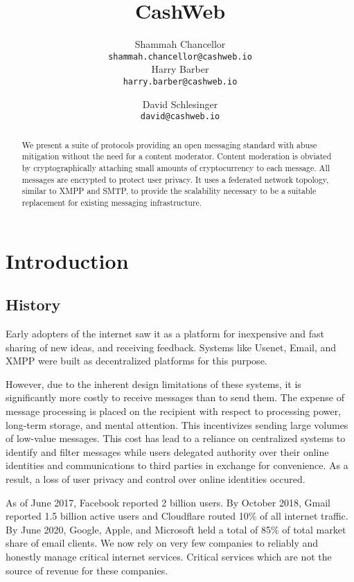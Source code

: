 \documentclass{article}
\title{CashWeb}
\author{
  Shammah Chancellor \\
  \texttt{shammah.chancellor@cashweb.io} \\
  \AND
  Harry Barber \\
  \texttt{harry.barber@cashweb.io} \\
  \and
  David Schlesinger \\
  \texttt{david@cashweb.io} \\
}
\begin{document}
\maketitle

\begin{abstract}
We present a suite of protocols providing an open messaging standard with abuse mitigation without the need for a content moderator. Content moderation is obviated by cryptographically attaching small amounts of cryptocurrency to each message. All messages are encrypted to protect user privacy. It uses a federated network topology, similar to XMPP and SMTP, to provide the scalability necessary to be a suitable replacement for existing messaging infrastructure. 
\end{abstract}

\section{Introduction}

\subsection{History}

Early adopters of the internet saw it as a platform for inexpensive and fast sharing of new ideas, and receiving feedback. Systems like Usenet\supercite{rfc5536}\supercite{rfc5537}, Email\supercite{rfc5322}\supercite{rfc1939}\supercite{rfc5321}\supercite{rfc4551}, and XMPP\supercite{rfc3920}\supercite{rfc3921}\supercite{rfc3922}\supercite{rfc3923} were built as decentralized platforms for this purpose.

However, due to the inherent design limitations of these systems, it is significantly more costly to receive messages than to send them. The expense of message processing is placed on the recipient with respect to processing power, long-term storage, and mental attention. This incentivizes sending large volumes of low-value messages. This cost has lead to a reliance on centralized systems to identify and filter messages while users delegated authority over their online identities and communications to third parties in exchange for convenience. As a result, a loss of user privacy and control over online identities occured.

As of June 2017, Facebook reported 2 billion users. By October 2018, Gmail reported 1.5 billion active users\supercite{gmail2018} and Cloudflare routed 10\% of all internet traffic\supercite{cloudflare2018}. By June 2020, Google, Apple, and Microsoft held a total of 85\% of total market share of email clients\supercite{emailshare2020}. We now rely on very few companies to reliably and honestly manage critical internet services. Critical services which are not the source of revenue for these companies.
\end{document}
